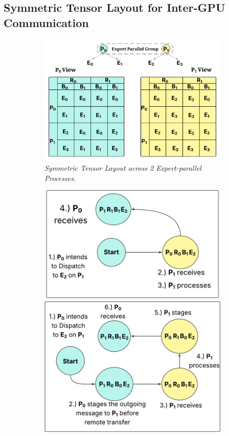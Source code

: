 \subsection{Symmetric Tensor Layout for Inter-GPU Communication}\label{subsec:symmetric-tensor-layout}
\begin{figure}[!ht]
    \centering
    \begin{subfigure}{0.62\textwidth}
        \centering
        \includegraphics[width=\linewidth, keepaspectratio]{figures/mem_layout}
        \caption{\emph{Symmetric Tensor Layout across 2 Expert-parallel Processes}.}
        \label{fig:mem_layout}
    \end{subfigure}
    \begin{subfigure}{0.36\textwidth}
        \centering
        \includegraphics[width=\linewidth, keepaspectratio]{figures/sm_big}

\end{subfigure}
\end{figure}
